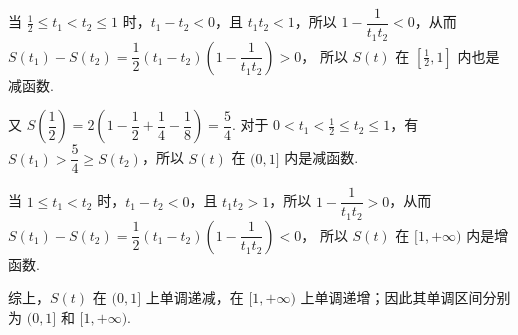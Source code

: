 \documentclass[UTF8,a4paper,oneside,11pt]{ctexbook}
\begin{document}
\begin{solution}
\begin{enumerate}
当 \(\frac12\le t_1<t_2\le1\) 时，\(t_1-t_2<0\)，且 \(t_1t_2<1\)，所以 \(1-\dfrac{1}{t_1t_2}<0\)，从而
\(S(t_1)-S(t_2)=\dfrac12(t_1-t_2)\left(1-\dfrac{1}{t_1t_2}\right)>0\)，
所以 \(S(t)\) 在 \([\frac12,1]\) 内也是减函数.

又
\(S\!\left(\dfrac12\right)=2\left(1-\dfrac12+\dfrac14-\dfrac18\right)=\dfrac54\).
对于 \(0<t_1<\frac12\le t_2\le1\)，有 \(S(t_1)>\dfrac54\ge S(t_2)\)，所以 \(S(t)\) 在 \((0,1]\) 内是减函数.

当 \(1\le t_1<t_2\) 时，\(t_1-t_2<0\)，且 \(t_1t_2>1\)，所以 \(1-\dfrac{1}{t_1t_2}>0\)，从而
\(S(t_1)-S(t_2)=\dfrac12(t_1-t_2)\left(1-\dfrac{1}{t_1t_2}\right)<0\)，
所以 \(S(t)\) 在 \([1,+\infty)\) 内是增函数.

综上，\(S(t)\) 在 \((0,1]\) 上单调递减，在 \([1,+\infty)\) 上单调递增；因此其单调区间分别为 \((0,1]\) 和 \([1,+\infty)\).
\end{enumerate}
\end{solution}

\end{document}
